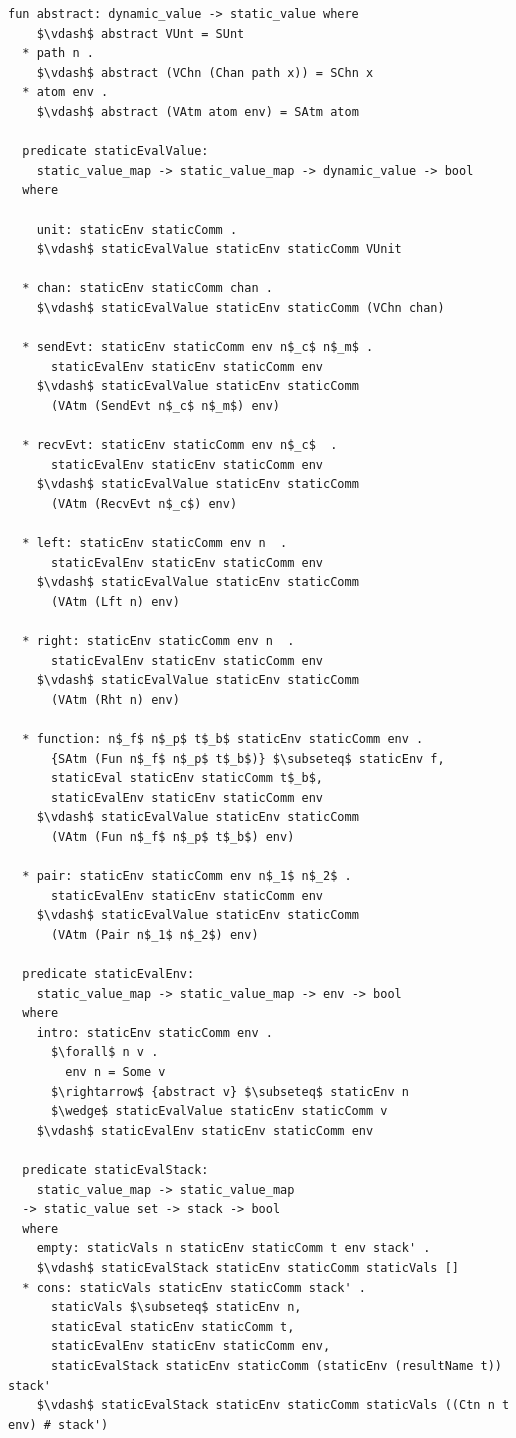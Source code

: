 \documentclass[letterpaper, 11pt]{extarticle}
\begin{document}
\begin{lstlisting}[language=logic, mathescape]
  fun abstract: dynamic_value -> static_value where
    $\vdash$ abstract VUnt = SUnt
  * path n . 
    $\vdash$ abstract (VChn (Chan path x)) = SChn x
  * atom env .
    $\vdash$ abstract (VAtm atom env) = SAtm atom

  predicate staticEvalValue:
    static_value_map -> static_value_map -> dynamic_value -> bool
  where

    unit: staticEnv staticComm .
    $\vdash$ staticEvalValue staticEnv staticComm VUnit

  * chan: staticEnv staticComm chan .
    $\vdash$ staticEvalValue staticEnv staticComm (VChn chan)

  * sendEvt: staticEnv staticComm env n$_c$ n$_m$ .
      staticEvalEnv staticEnv staticComm env
    $\vdash$ staticEvalValue staticEnv staticComm
      (VAtm (SendEvt n$_c$ n$_m$) env)

  * recvEvt: staticEnv staticComm env n$_c$  .
      staticEvalEnv staticEnv staticComm env
    $\vdash$ staticEvalValue staticEnv staticComm
      (VAtm (RecvEvt n$_c$) env)

  * left: staticEnv staticComm env n  .
      staticEvalEnv staticEnv staticComm env
    $\vdash$ staticEvalValue staticEnv staticComm
      (VAtm (Lft n) env)

  * right: staticEnv staticComm env n  .
      staticEvalEnv staticEnv staticComm env
    $\vdash$ staticEvalValue staticEnv staticComm
      (VAtm (Rht n) env)

  * function: n$_f$ n$_p$ t$_b$ staticEnv staticComm env .
      {SAtm (Fun n$_f$ n$_p$ t$_b$)} $\subseteq$ staticEnv f, 
      staticEval staticEnv staticComm t$_b$, 
      staticEvalEnv staticEnv staticComm env
    $\vdash$ staticEvalValue staticEnv staticComm
      (VAtm (Fun n$_f$ n$_p$ t$_b$) env)

  * pair: staticEnv staticComm env n$_1$ n$_2$ .
      staticEvalEnv staticEnv staticComm env
    $\vdash$ staticEvalValue staticEnv staticComm
      (VAtm (Pair n$_1$ n$_2$) env)

  predicate staticEvalEnv:
    static_value_map -> static_value_map -> env -> bool
  where 
    intro: staticEnv staticComm env .
      $\forall$ n v .
        env n = Some v 
      $\rightarrow$ {abstract v} $\subseteq$ staticEnv n
      $\wedge$ staticEvalValue staticEnv staticComm v
    $\vdash$ staticEvalEnv staticEnv staticComm env

  predicate staticEvalStack:
    static_value_map -> static_value_map 
  -> static_value set -> stack -> bool 
  where
    empty: staticVals n staticEnv staticComm t env stack' .
    $\vdash$ staticEvalStack staticEnv staticComm staticVals []
  * cons: staticVals staticEnv staticComm stack' . 
      staticVals $\subseteq$ staticEnv n,
      staticEval staticEnv staticComm t,
      staticEvalEnv staticEnv staticComm env,
      staticEvalStack staticEnv staticComm (staticEnv (resultName t)) stack' 
    $\vdash$ staticEvalStack staticEnv staticComm staticVals ((Ctn n t env) # stack')


\end{lstlisting}
\end{document}
